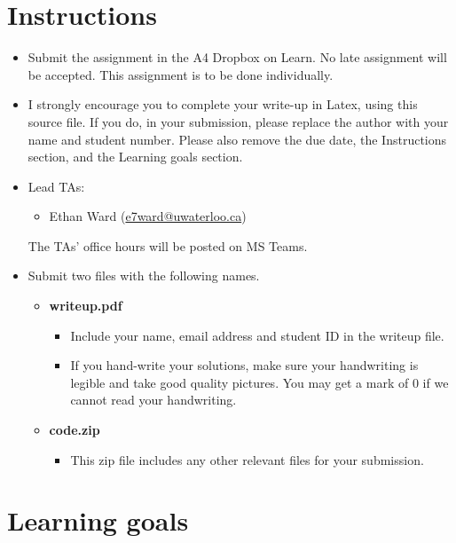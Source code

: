\documentclass[12pt]{article}
\begin{document}
\newpage
\section*{Instructions}

\begin{itemize}
\item
Submit the assignment in the A4 Dropbox on Learn. 
No late assignment will be accepted. This assignment is to be done individually.

\item 
I strongly encourage you to complete your write-up in Latex, using this source file. If you do, in your submission, please replace the author with your name and student number. Please also remove the due date, the Instructions section, and the Learning goals section. 
\item
Lead TAs: 
\begin{itemize}
\item
Ethan Ward (\href{mailto:e7ward@uwaterloo.ca}{e7ward@uwaterloo.ca})
\end{itemize}
The TAs' office hours will be posted on MS Teams.
\item
Submit two files with the following names.

\begin{itemize}
\item
{\bf writeup.pdf}

\begin{itemize}
\item
Include your name, email address and student ID in the writeup file.
\item
If you hand-write your solutions, make sure your handwriting is legible and take good quality pictures. You may get a mark of 0 if we cannot read your handwriting.

\end{itemize}
\item
{\bf code.zip}

\begin{itemize}
\item
This zip file includes any other relevant files for your submission.

\end{itemize}

\end{itemize}
\end{itemize}



\section*{Learning goals}
\end{document}
